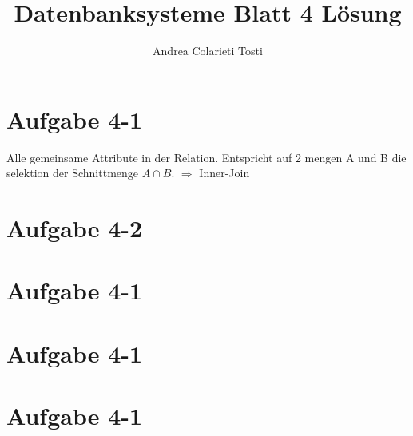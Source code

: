 \documentclass[12pt,a4paper]{article}
\author{Andrea Colarieti Tosti}
\title{Datenbanksysteme Blatt 4 Lösung}
\begin{document}
\maketitle
\section*{Aufgabe 4-1}
Alle gemeinsame Attribute in der Relation. Entspricht auf 2 mengen A und B die selektion der Schnittmenge $ A \cap B $.
$\Rightarrow$ Inner-Join
\section*{Aufgabe 4-2}

\section*{Aufgabe 4-1}
\section*{Aufgabe 4-1}
\section*{Aufgabe 4-1}
\end{document}
